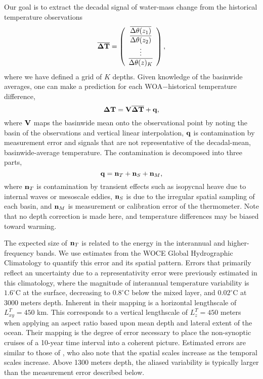 \documentclass[12pt]{article}
\begin{document}
Our goal is to extract the decadal signal of water-mass change from
the historical temperature observations 
\begin{equation}
\overline{{\boldsymbol \Delta}{\bf T}} = \left(\begin{array}{c} \overline{\Delta \theta(z_1)}
                  \\\overline{\Delta \theta(z_2)} \\ \vdots \\ \overline{\Delta \theta(z)_K} 
 \end{array} \right),
\end{equation}
where we have defined a grid of $K$ depths.  Given knowledge of the
basinwide averages, one can make a prediction for each WOA$-$historical temperature difference,
\begin{equation}
{\boldsymbol \Delta}{\bf T} = {\bf V}\overline{{\boldsymbol \Delta}{\bf T}} + {\bf q},
\end{equation}
where ${\bf V}$ maps the basinwide mean onto the observational point
by noting the basin of the observations and vertical linear
interpolation, ${\bf q}$ is contamination by measurement error and
signals that are not representative of the decadal-mean,
basinwide-average temperature. The contamination is decomposed into
three parts,
\begin{equation}
{\bf q} = {\bf n}_T + {\bf n}_S + {\bf n}_M,
\end{equation}
where ${\bf n}_T$ is contamination by transient effects such as
isopycnal heave due to internal waves or mesoscale eddies, ${\bf n}_S$
is due to the irregular spatial sampling of each basin, and
${\bf n}_M$ is measurement or calibration error of the
thermometer. Note that no depth correction is made here, and
temperature differences may be biased toward warming.

The expected size of ${\bf n}_T$ is related to the energy in the
interannual and higher-frequency bands. We use estimates from the WOCE
Global Hydrographic Climatology \cite{Gouretski-Koltermann-2004:WOCE}
to quantify this error and its spatial pattern.  Errors that primarily
reflect an uncertainty due to a representativity error were previously
estimated in this climatology, where the magnitude of interannual
temperature variability is $1.6^{\circ}$C at the surface, decreasing
to $0.8^{\circ}$C below the mixed layer, and $0.02^{\circ}$C at 3000
meters depth. Inherent in their mapping is a horizontal lengthscale of
$L_{xy}^{T}=450$ km. This corresponds to a vertical lengthscale of
$L_z^{T}=450$ meters when applying an aspect ratio based upon mean
depth and lateral extent of the ocean. Their mapping is the degree of
error necessary to place the non-synoptic cruises of a 10-year time
interval into a coherent picture. Estimated errors are similar to
those of \cite{Wortham-Wunsch-2014:multidimensional}, who also note
that the spatial scales increase as the temporal scales
increase. Above 1300 meters depth, the aliased variability is
typically larger than the measurement error described below.
\end{document}
